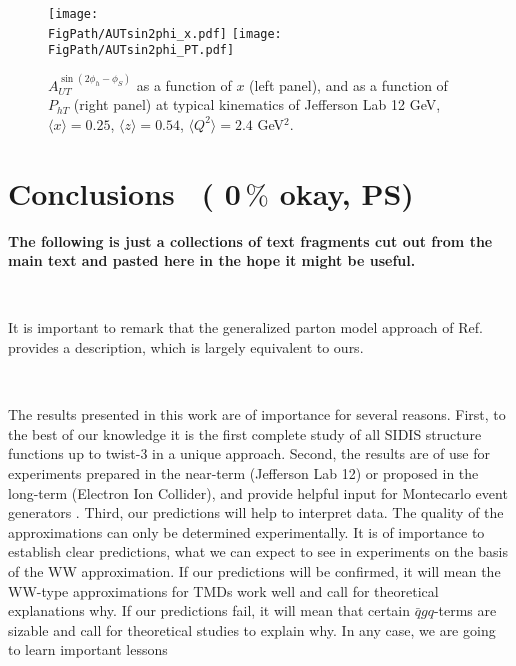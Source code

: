 \documentclass[a4paper,11pt]{article}
\newcommand{\blue}[1]{{\color{blue} #1}}
\newcommand{\red}[1]{{\color{red} #1}}
\newcommand{\la}{\langle}
\newcommand{\ra}{\rangle}
\newcommand{\judge}[1]{{\boldmath \ ({\lowercase\blue{#1}}, PS)}}
\newcommand*{\FigPath}{./figs}%
\begin{document}
\begin{figure}[ht]
\centering
\texttt{[image: \\FigPath/AUTsin2phi\_x.pdf]} 
\texttt{[image: \\FigPath/AUTsin2phi\_PT.pdf]}
\caption{\label{autsin2phi_jlab} $A_{UT}^{\sin(2\phi_h- \phi_S)}$  as a function of $ x $ (left panel), and   as a function of $P_{hT}$ (right panel) at typical kinematics of Jefferson Lab 12 GeV, $\la x\ra = 0.25$, $\la z\ra = 0.54$, $\la Q^2\ra = 2.4$ GeV$^2$.
}
\end{figure}






{}

\newpage
\section{Conclusions  \judge{0$\,\%$ okay}}
\label{Sec-8:conclusions}

\red{\bf The following is just a collections of text fragments cut out
from the main text and pasted here in the hope it might be useful.}

\

It is important to remark that the generalized parton model 
approach of Ref.~\cite{Anselmino:2011ch} provides a description,
which is largely equivalent to ours.

\

The results presented in this work are of importance for several reasons.
First, to the best of our knowledge it is the first complete study 
of all SIDIS structure functions up to twist-3 in a unique approach. 
Second, the results are of use for experiments prepared in the near-term 
(Jefferson Lab 12) or proposed in the long-term (Electron Ion Collider),
and provide helpful input for Montecarlo event generators 
\cite{Avakian:2015vha}.
Third, our predictions will help to interpret data.
The quality of the approximations can only be determined experimentally. 
It is of importance to establish clear predictions, what we can expect 
to see in experiments on the basis of the WW approximation.
If our predictions will be confirmed, it will mean the WW-type approximations
for TMDs work well and call for theoretical explanations why.
If our predictions fail, it will mean that certain $\bar{q}gq$-terms are
sizable and call for theoretical studies to explain why.
In any case, we are going to learn important lessons
\end{document}
